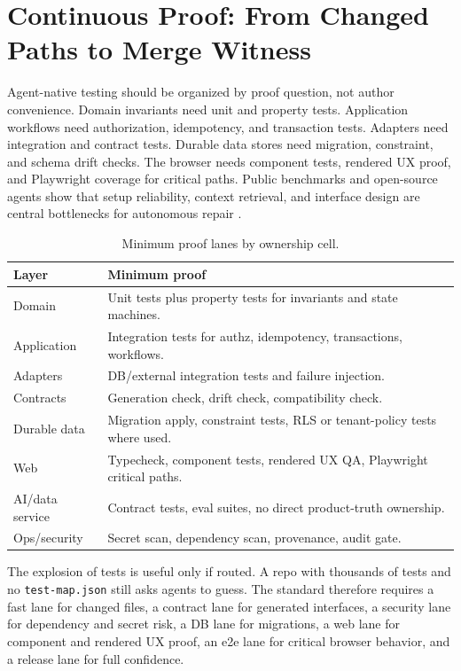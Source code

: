 \section{Continuous Proof: From Changed Paths to Merge Witness}

Agent-native testing should be organized by proof question, not author convenience. Domain invariants need unit and property tests. Application workflows need authorization, idempotency, and transaction tests. Adapters need integration and contract tests. Durable data stores need migration, constraint, and schema drift checks. The browser needs component tests, rendered UX proof, and Playwright coverage for critical paths. Public benchmarks and open-source agents show that setup reliability, context retrieval, and interface design are central bottlenecks for autonomous repair \cite{sweAgentAci2024,sweBench2024,setupBench2025,contextBench2026,openhands2024,aiderGithub2026}.

\begin{table}[t]
\caption{Minimum proof lanes by ownership cell.}
\label{tab:proof-lanes}
\centering
\small
\begin{tabularx}{\columnwidth}{L{0.28\columnwidth} Y}
\toprule
\textbf{Layer} & \textbf{Minimum proof} \\
\midrule
Domain & Unit tests plus property tests for invariants and state machines. \\
Application & Integration tests for authz, idempotency, transactions, workflows. \\
Adapters & DB/external integration tests and failure injection. \\
Contracts & Generation check, drift check, compatibility check. \\
Durable data & Migration apply, constraint tests, RLS or tenant-policy tests where used. \\
Web & Typecheck, component tests, rendered UX QA, Playwright critical paths. \\
AI/data service & Contract tests, eval suites, no direct product-truth ownership. \\
Ops/security & Secret scan, dependency scan, provenance, audit gate. \\
\bottomrule
\end{tabularx}
\end{table}

The explosion of tests is useful only if routed. A repo with thousands of tests and no \texttt{test-map.json} still asks agents to guess. The standard therefore requires a fast lane for changed files, a contract lane for generated interfaces, a security lane for dependency and secret risk, a DB lane for migrations, a web lane for component and rendered UX proof, an e2e lane for critical browser behavior, and a release lane for full confidence.

